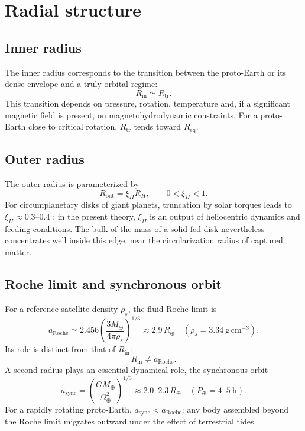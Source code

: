 \documentclass[11pt,a4paper,openany]{report}
\newcommand{\Mt}{M_{\oplus}}
\newcommand{\Rt}{R_{\oplus}}
\newcommand{\Req}{R_{\mathrm{eq}}}
\newcommand{\aR}{a_{\mathrm{Roche}}}
\begin{document}
\section{Radial structure}
\subsection{Inner radius}

The inner radius corresponds to the transition between the proto-Earth or its dense envelope and a
truly orbital regime:
\begin{equation}
R_{\mathrm{in}}\simeq R_{\mathrm{tr}}.
\label{eq:Rin}
\end{equation}
This transition depends on pressure, rotation, temperature and, if a significant magnetic field is
present, on magnetohydrodynamic constraints. For a proto-Earth close to critical rotation,
$R_{\mathrm{tr}}$ tends toward $\Req$.

\subsection{Outer radius}

The outer radius is parameterized by
\begin{equation}
R_{\mathrm{out}}=\xi_H R_H,\qquad 0<\xi_H<1.
\label{eq:Rout}
\end{equation}
For circumplanetary disks of giant planets, truncation by solar torques leads to
$\xi_H\approx0.3$--$0.4$ \cite{QuillenTrilling1998,MartinLubow2011}; in the present theory,
$\xi_H$ is an output of heliocentric dynamics and feeding conditions. The bulk of the mass of a
solid-fed disk nevertheless concentrates well inside this edge, near the circularization radius of
captured matter.

\subsection{Roche limit and synchronous orbit}

For a reference satellite density $\rho_s$, the fluid Roche limit is
\begin{equation}
\aR\simeq2.456\left(\frac{3\Mt}{4\pi\rho_s}\right)^{1/3}
\approx2.9\,\Rt\quad(\rho_s=3.34\ \mathrm{g\,cm^{-3}}).
\label{eq:Roche}
\end{equation}
Its role is distinct from that of $R_{\mathrm{in}}$:
\begin{equation}
R_{\mathrm{in}}\neq\aR.
\label{eq:RinRoche}
\end{equation}
A second radius plays an essential dynamical role, the synchronous orbit
\begin{equation}
a_{\mathrm{sync}}=\left(\frac{G\Mt}{\Omega_\oplus^2}\right)^{1/3}\approx2.0\text{--}2.3\,\Rt
\quad(P_\oplus=4\text{--}5\ \mathrm{h}).
\label{eq:async}
\end{equation}
For a rapidly rotating proto-Earth, $a_{\mathrm{sync}}<\aR$: any body assembled beyond the Roche
limit migrates outward under the effect of terrestrial tides.
\end{document}
